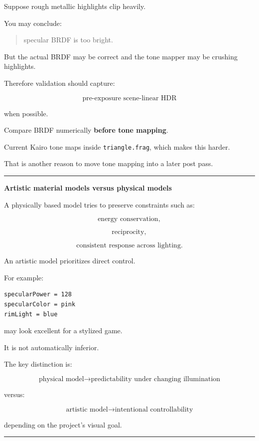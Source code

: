 Suppose rough metallic highlights clip heavily.

You may conclude:

\begin{quote}
specular BRDF is too bright.
\end{quote}

But the actual BRDF may be correct and the tone mapper may be crushing highlights.

Therefore validation should capture:

\[
\text{pre-exposure scene-linear HDR}
\]

when possible.

Compare BRDF numerically \textbf{before tone mapping}.

Current Kairo tone maps inside \texttt{triangle.frag}, which makes this harder.

That is another reason to move tone mapping into a later post pass.

\begin{center}\rule{0.5\linewidth}{0.5pt}\end{center}

\textbf{Artistic material models versus physical models}

A physically based model tries to preserve constraints such as:

\[
\text{energy conservation},
\]

\[
\text{reciprocity},
\]

\[
\text{consistent response across lighting}.
\]

An artistic model prioritizes direct control.

For example:

\begin{verbatim}
specularPower = 128
specularColor = pink
rimLight = blue
\end{verbatim}

may look excellent for a stylized game.

It is not automatically inferior.

The key distinction is:

\[
\boxed{
\text{physical model}
\rightarrow
\text{predictability under changing illumination}
}
\]

versus:

\[
\boxed{
\text{artistic model}
\rightarrow
\text{intentional controllability}
}
\]

depending on the project's visual goal.

\begin{center}\rule{0.5\linewidth}{0.5pt}\end{center}

